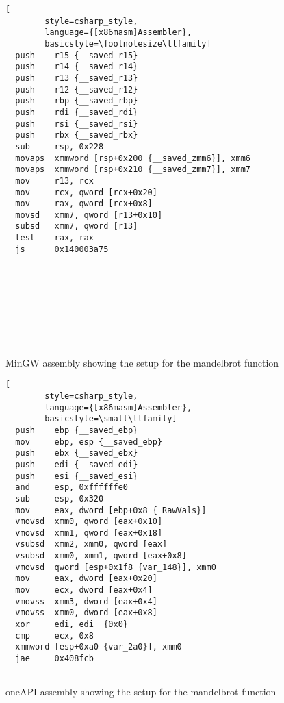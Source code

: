\begin{figure}[ht]
    \begin{minipage}[b]{0.5\linewidth}
    \begin{lstlisting}[
        style=csharp_style,
        language={[x86masm]Assembler},
        basicstyle=\footnotesize\ttfamily]
  push    r15 {__saved_r15}
  push    r14 {__saved_r14}
  push    r13 {__saved_r13}
  push    r12 {__saved_r12}
  push    rbp {__saved_rbp}
  push    rdi {__saved_rdi}
  push    rsi {__saved_rsi}
  push    rbx {__saved_rbx}
  sub     rsp, 0x228
  movaps  xmmword [rsp+0x200 {__saved_zmm6}], xmm6
  movaps  xmmword [rsp+0x210 {__saved_zmm7}], xmm7
  mov     r13, rcx
  mov     rcx, qword [rcx+0x20]
  mov     rax, qword [rcx+0x8]
  movsd   xmm7, qword [r13+0x10]
  subsd   xmm7, qword [r13]
  test    rax, rax
  js      0x140003a75
        




    

    
    \end{lstlisting}
    \caption{MinGW assembly showing the setup for the mandelbrot function}
    \label{fig:assembly1}
    \end{minipage}
    \hspace{0.5cm}
    \begin{minipage}[b]{0.5\linewidth}
    \begin{lstlisting}[
        style=csharp_style,
        language={[x86masm]Assembler},
        basicstyle=\small\ttfamily]
  push    ebp {__saved_ebp}
  mov     ebp, esp {__saved_ebp}
  push    ebx {__saved_ebx}
  push    edi {__saved_edi}
  push    esi {__saved_esi}
  and     esp, 0xffffffe0
  sub     esp, 0x320
  mov     eax, dword [ebp+0x8 {_RawVals}]
  vmovsd  xmm0, qword [eax+0x10]
  vmovsd  xmm1, qword [eax+0x18]
  vsubsd  xmm2, xmm0, qword [eax]
  vsubsd  xmm0, xmm1, qword [eax+0x8]
  vmovsd  qword [esp+0x1f8 {var_148}], xmm0
  mov     eax, dword [eax+0x20]
  mov     ecx, dword [eax+0x4]
  vmovss  xmm3, dword [eax+0x4]
  vmovss  xmm0, dword [eax+0x8]
  xor     edi, edi  {0x0}
  cmp     ecx, 0x8
  xmmword [esp+0xa0 {var_2a0}], xmm0
  jae     0x408fcb
        
    \end{lstlisting}
    \caption{oneAPI assembly showing the setup for the mandelbrot function}
    \label{fig:assembly2}
    \end{minipage}
\end{figure}

